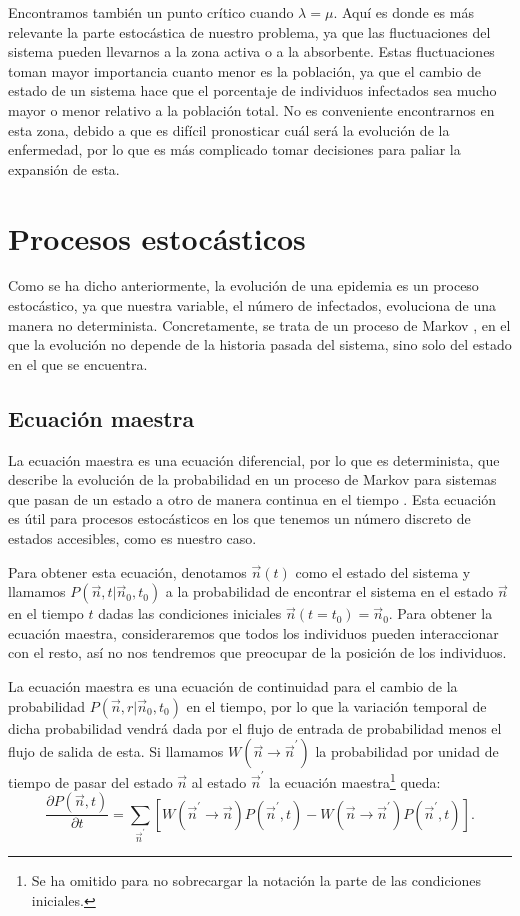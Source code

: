 Encontramos también un punto crítico cuando $\lambda = \mu$. Aquí es donde es más relevante 
la parte estocástica de nuestro problema, ya que las fluctuaciones del sistema pueden llevarnos a la zona activa o a la absorbente. 
Estas fluctuaciones toman mayor importancia cuanto menor es la población, ya que el cambio de estado de un sistema hace que el porcentaje de
individuos infectados sea mucho mayor o menor relativo a la población total. No es conveniente encontrarnos en esta zona, debido a que es difícil pronosticar
cuál será la evolución de la enfermedad, por lo que es más complicado tomar decisiones para paliar la expansión de esta.




\section{Procesos estocásticos}
Como se ha dicho anteriormente, la evolución de una epidemia es un proceso estocástico, ya que nuestra variable, el número de infectados, evoluciona
de una manera no determinista. Concretamente, se trata de un proceso de Markov \cite{McKane}, en el que la evolución no depende de la
historia pasada del sistema, sino solo del estado en el que se encuentra.


\subsection{Ecuación maestra}
La ecuación maestra es una ecuación diferencial, por lo que es determinista, que describe la evolución de la probabilidad en un proceso de Markov para sistemas que 
pasan de un estado a otro de manera continua en el tiempo \cite{McKane}. Esta ecuación es útil para procesos estocásticos en los que tenemos un número discreto
de estados accesibles, como es nuestro caso. 

Para obtener esta ecuación, denotamos $\vec{n}(t)$ como el estado del sistema y llamamos \newline
$P(\vec{n},t|\vec{n}_0,t_0)$ a la probabilidad de encontrar el sistema en el estado $\vec{n}$ en el tiempo $t$ dadas las condiciones iniciales $\vec{n}(t=t_0)=\vec{n}_0$. Para obtener la 
ecuación maestra, consideraremos que todos los individuos pueden interaccionar con el resto, así no nos tendremos que preocupar de la 
posición de los individuos.

La ecuación maestra es una ecuación de continuidad para el cambio de la probabilidad $P(\vec{n},r|\vec{n}_0,t_0)$ en el tiempo,
por lo que la variación temporal de dicha probabilidad vendrá dada por el flujo de entrada de probabilidad menos el flujo de salida de esta.
Si llamamos $W(\vec{n}\rightarrow \vec{n}^{\prime})$ la probabilidad por unidad de tiempo de pasar del estado $\vec{n}$ al estado $\vec{n}^{\prime}$
la ecuación maestra\footnote{Se ha omitido para no sobrecargar la notación la parte de las condiciones iniciales.} queda:
\begin{equation}
    \dfrac{\partial P(\vec{n},t)}{\partial t}=\sum_{\vec{n}^{\prime}}\left[ W(\vec{n}^{\prime}\rightarrow\vec{n}) P(\vec{n}^{\prime},t) - W(\vec{n}\rightarrow\vec{n}^{\prime}) P( \vec{n}^{\prime},t)\right].
    \label{eq:Ecuación maestra}
\end{equation}

